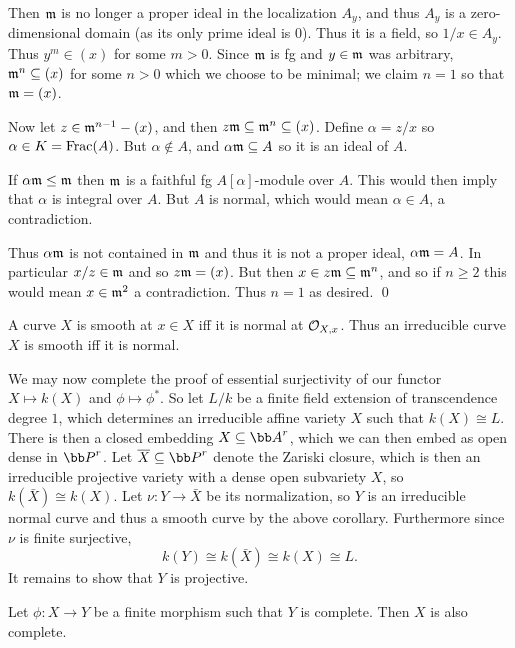     Then ${{\frak m}}$ is no longer a proper ideal in the localization $A_y$, and thus $A_y$ is a zero-dimensional domain (as its only prime ideal is $0$).
    Thus it is a field, so $1/x\in A_y$.
    Thus $y^m\in(x)$ for some $m>0$.
    Since ${{\frak m}}$ is fg and $y\in{{\frak m}}$ was arbitrary, ${{\frak m}}^n\subseteq(x)$ for some $n>0$ which we choose to be minimal; we claim $n=1$ so that ${{\frak m}}=(x)$.

    Now let $z\in{{\frak m}}^{n-1}-(x)$, and then $z{{\frak m}}\subseteq{{\frak m}}^n\subseteq(x)$.
    Define $\alpha=z/x$ so $\alpha\in K={\rm Frac}(A)$.
    But $\alpha\notin A$, and $\alpha{{\frak m}}\subseteq A$ so it is an ideal of $A$.

    If $\alpha{{\frak m}}\leq{{\frak m}}$ then ${{\frak m}}$ is a faithful fg $A[\alpha]$-module over $A$.
    This would then imply that $\alpha$ is integral over $A$.
    But $A$ is normal, which would mean $\alpha\in A$, a contradiction.

    Thus $\alpha{{\frak m}}$ is not contained in ${{\frak m}}$ and thus it is not a proper ideal, $\alpha{{\frak m}}=A$.
    In particular $x/z\in{{\frak m}}$ and so $z{{\frak m}}=(x)$.
    But then $x\in z{{\frak m}}\subseteq{{\frak m}}^n$, and so if $n\geq2$ this would mean $x\in{{\frak m}}^2$ a contradiction.
    Thus $n=1$ as desired.
    \qed

\eproof

\bcoro

    A curve $X$ is smooth at $x\in X$ iff it is normal at ${{\cal O}}_{X,x}$.
    Thus an irreducible curve $X$ is smooth iff it is normal.

\ecoro

We may now complete the proof of essential surjectivity of our functor $X\mapsto k(X)$ and $\phi\mapsto\phi^*$.
So let $L/k$ be a finite field extension of transcendence degree $1$, which determines an irreducible affine variety $X$ such that $k(X)\cong L$.
There is then a closed embedding $X\subseteq\bA^r$, which we can then embed as open dense in $\bP^r$.
Let $\cl X\subseteq\bP^r$ denote the Zariski closure, which is then an irreducible projective variety with a dense open subvariety $X$, so $k(\bar X)\cong k(X)$.
Let $\nu\colon Y\to\bar X$ be its normalization, so $Y$ is an irreducible normal curve and thus a smooth curve by the above corollary.
Furthermore since $\nu$ is finite surjective,
$$ k(Y) \cong k(\bar X) \cong k(X) \cong L . $$
It remains to show that $Y$ is projective.

\blemm

    Let $\phi\colon X\to Y$ be a finite morphism such that $Y$ is complete.
    Then $X$ is also complete.

\elemm


